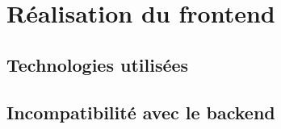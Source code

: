 \section{Réalisation du frontend}

\subsection{Technologies utilisées}

\subsection{Incompatibilité avec le backend}





